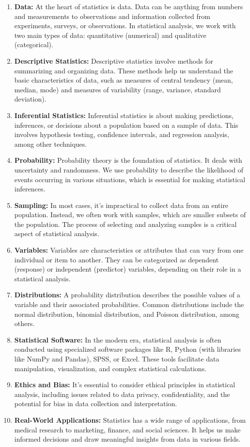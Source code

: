 \documentclass[
  a4paper,
]{scrbook}
\begin{document}
\begin{enumerate}
\def\labelenumi{\arabic{enumi}.}
\item
  \textbf{Data:} At the heart of statistics is data. Data can be
  anything from numbers and measurements to observations and information
  collected from experiments, surveys, or observations. In statistical
  analysis, we work with two main types of data: quantitative
  (numerical) and qualitative (categorical).
\item
  \textbf{Descriptive Statistics:} Descriptive statistics involve
  methods for summarizing and organizing data. These methods help us
  understand the basic characteristics of data, such as measures of
  central tendency (mean, median, mode) and measures of variability
  (range, variance, standard deviation).
\item
  \textbf{Inferential Statistics:} Inferential statistics is about
  making predictions, inferences, or decisions about a population based
  on a sample of data. This involves hypothesis testing, confidence
  intervals, and regression analysis, among other techniques.
\item
  \textbf{Probability:} Probability theory is the foundation of
  statistics. It deals with uncertainty and randomness. We use
  probability to describe the likelihood of events occurring in various
  situations, which is essential for making statistical inferences.
\item
  \textbf{Sampling:} In most cases, it's impractical to collect data
  from an entire population. Instead, we often work with samples, which
  are smaller subsets of the population. The process of selecting and
  analyzing samples is a critical aspect of statistical analysis.
\item
  \textbf{Variables:} Variables are characteristics or attributes that
  can vary from one individual or item to another. They can be
  categorized as dependent (response) or independent (predictor)
  variables, depending on their role in a statistical analysis.
\item
  \textbf{Distributions:} A probability distribution describes the
  possible values of a variable and their associated probabilities.
  Common distributions include the normal distribution, binomial
  distribution, and Poisson distribution, among others.
\item
  \textbf{Statistical Software:} In the modern era, statistical analysis
  is often conducted using specialized software packages like R, Python
  (with libraries like NumPy and Pandas), SPSS, or Excel. These tools
  facilitate data manipulation, visualization, and complex statistical
  calculations.
\item
  \textbf{Ethics and Bias:} It's essential to consider ethical
  principles in statistical analysis, including issues related to data
  privacy, confidentiality, and the potential for bias in data
  collection and interpretation.
\item
  \textbf{Real-World Applications:} Statistics has a wide range of
  applications, from medical research to marketing, finance, and social
  sciences. It helps us make informed decisions and draw meaningful
  insights from data in various fields.
\end{enumerate}
\end{document}
